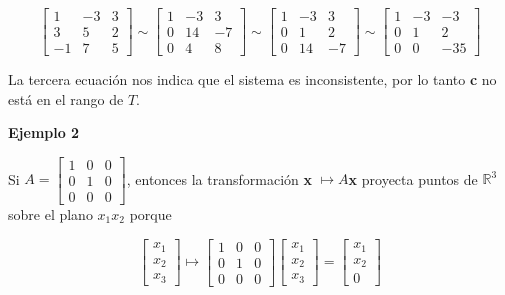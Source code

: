 \documentclass[12 pt]{article}
\begin{document}
\begin{equation*}
    \left[\begin{array}{rr|r}
    1 & -3 & 3 \\
    3 & 5 & 2 \\
    -1 & 7 & 5
    \end{array}\right] \sim\left[\begin{array}{rr|r}
    1 & -3 & 3 \\
    0 & 14 & -7 \\
    0 & 4 & 8
    \end{array}\right] \sim\left[\begin{array}{rr|r}
    1 & -3 & 3 \\
    0 & 1 & 2 \\
    0 & 14 & -7
    \end{array}\right] \sim\left[\begin{array}{rr|r}
    1 & -3 & -3 \\
    0 & 1 & 2 \\
    0 & 0 & -35
    \end{array}\right]
\end{equation*}

La tercera ecuación nos indica que el sistema es inconsistente, por lo tanto \textbf{c} no está en el rango de $T$.

\begin{large}
    \textbf{Ejemplo 2}
\end{large}

Si $A = \begin{bmatrix}
    1 & 0 & 0 \\
    0 & 1 & 0 \\
    0 & 0 & 0
\end{bmatrix}$, entonces la transformación \textbf{x} $\longmapsto A$\textbf{x} proyecta puntos de $\mathbb{R}^3$ sobre el plano $x_1x_2$ porque 

\begin{equation*}
    \begin{bmatrix}
        x_1 \\ x_2 \\ x_3
    \end{bmatrix}
    \longmapsto \begin{bmatrix}
        1 & 0 & 0 \\
        0 & 1 & 0 \\
        0 & 0 & 0
    \end{bmatrix}
    \begin{bmatrix}
        x_1 \\ x_2 \\ x_3
    \end{bmatrix}
    = \begin{bmatrix}
        x_1 \\ x_2 \\ 0
    \end{bmatrix}
\end{equation*}
\end{document}
